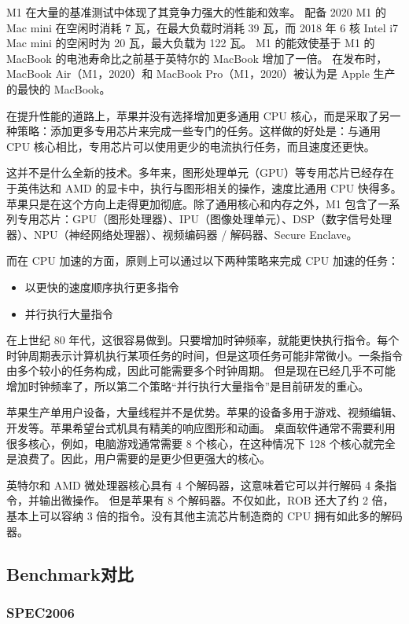 \documentclass[a4paper]{article}
\begin{document}
M1 在大量的基准测试中体现了其竞争力强大的性能和效率。
配备 2020 M1 的 Mac mini 在空闲时消耗 7 瓦，在最大负载时消耗 39 瓦，而 2018 年 6 核 Intel i7 Mac mini 的空闲时为 20 瓦，最大负载为 122 瓦。 M1 的能效使基于 M1 的 MacBook 的电池寿命比之前基于英特尔的 MacBook 增加了一倍。
在发布时，MacBook Air（M1，2020）和 MacBook Pro（M1，2020）被认为是 Apple 生产的最快的 MacBook。

在提升性能的道路上，苹果并没有选择增加更多通用 CPU 核心，而是采取了另一种策略：添加更多专用芯片来完成一些专门的任务。这样做的好处是：与通用 CPU 核心相比，专用芯片可以使用更少的电流执行任务，而且速度还更快。

这并不是什么全新的技术。多年来，图形处理单元（GPU）等专用芯片已经存在于英伟达和 AMD 的显卡中，执行与图形相关的操作，速度比通用 CPU 快得多。
苹果只是在这个方向上走得更加彻底。除了通用核心和内存之外，M1 包含了一系列专用芯片：GPU（图形处理器）、IPU（图像处理单元）、DSP（数字信号处理器）、NPU（神经网络处理器）、视频编码器 / 解码器、Secure Enclave。

而在 CPU 加速的方面，原则上可以通过以下两种策略来完成 CPU 加速的任务：

\begin{itemize}
  \item 以更快的速度顺序执行更多指令
  \item 并行执行大量指令
\end{itemize}

在上世纪 80 年代，这很容易做到。只要增加时钟频率，就能更快执行指令。每个时钟周期表示计算机执行某项任务的时间，但是这项任务可能非常微小。一条指令由多个较小的任务构成，因此可能需要多个时钟周期。
但是现在已经几乎不可能增加时钟频率了，所以第二个策略“并行执行大量指令”是目前研发的重心。

苹果生产单用户设备，大量线程并不是优势。苹果的设备多用于游戏、视频编辑、开发等。苹果希望台式机具有精美的响应图形和动画。
桌面软件通常不需要利用很多核心，例如，电脑游戏通常需要 8 个核心，在这种情况下 128 个核心就完全是浪费了。因此，用户需要的是更少但更强大的核心。

英特尔和 AMD 微处理器核心具有 4 个解码器，这意味着它可以并行解码 4 条指令，并输出微操作。
但是苹果有 8 个解码器。不仅如此，ROB 还大了约 2 倍，基本上可以容纳 3 倍的指令。没有其他主流芯片制造商的 CPU 拥有如此多的解码器。

\subsection{Benchmark对比}

\subsubsection{SPEC2006}
\end{document}
